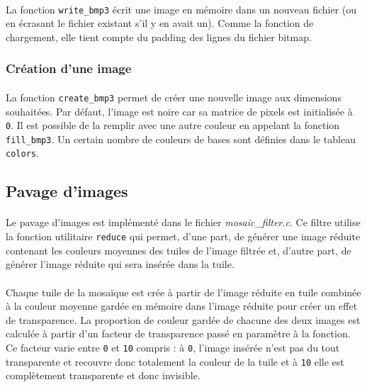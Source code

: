 \documentclass{article}
\begin{document}
    \paragraph{}
    La fonction \texttt{write\_bmp3} écrit une image en mémoire dans un nouveau fichier (ou en écrasant le fichier existant s'il y en avait un). Comme la fonction de chargement, elle tient compte du padding des lignes du fichier bitmap.

    \subsubsection{Création d'une image}
    \paragraph{}
    La fonction \texttt{create\_bmp3} permet de créer une nouvelle image aux dimensions souhaitées. Par défaut, l'image est noire car sa matrice de pixels est initialisée à \texttt{0}. Il est possible de la remplir avec une autre couleur en appelant la fonction \texttt{fill\_bmp3}. Un certain nombre de couleurs de bases sont définies dans le tableau \texttt{colors}. 



    \subsection{Pavage d'images}
    \paragraph{}
    Le pavage d'images est implémenté dans le fichier \emph{mosaic\_filter.c}. Ce filtre utilise la fonction utilitaire \texttt{reduce} qui permet, d'une part, de générer une image réduite contenant les couleurs moyennes des tuiles de l'image filtrée et, d'autre part, de générer l'image réduite qui sera insérée dans la tuile.

    \paragraph{}
    Chaque tuile de la mosaïque est crée à partir de l'image réduite en tuile combinée à la couleur moyenne gardée en mémoire dans l'image réduite pour créer un effet de transparence. La proportion de couleur gardée de chacune des deux images est calculée à partir d'un facteur de transparence passé en paramètre à la fonction. Ce facteur varie entre \texttt{0} et \texttt{10} compris : à \texttt{0}, l'image insérée n'est pas du tout transparente et recouvre donc totalement la couleur de la tuile et à \texttt{10} elle est complètement transparente et donc invisible.
\end{document}
